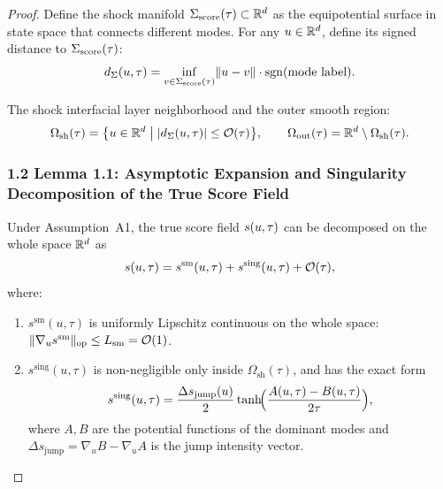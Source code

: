 \begin{proof}
Define the shock manifold $\Sigma_{\mathrm{score}}(\tau) \subset \mathbb{R}^d$ as the equipotential surface in state space that connects different modes. For any $u \in \mathbb{R}^d$, define its signed distance to $\Sigma_{\mathrm{score}}(\tau)$:
\begin{equation}
  d_{\Sigma}(u, \tau) = \inf_{v \in \Sigma_{\mathrm{score}}(\tau)} \lVert u - v \rVert \cdot \mathrm{sgn}(\text{mode label}).
\end{equation}

The shock interfacial layer neighborhood and the outer smooth region:
\begin{equation}
  \Omega_{\mathrm{sh}}(\tau) = \bigl\{ u \in \mathbb{R}^d \;\big|\; |d_{\Sigma}(u, \tau)| \leq \mathcal{O}(\tau) \bigr\}, \qquad
  \Omega_{\mathrm{out}}(\tau) = \mathbb{R}^d \setminus \Omega_{\mathrm{sh}}(\tau).
\end{equation}

\subsubsection{1.2 Lemma 1.1: Asymptotic Expansion and Singularity Decomposition of the True Score Field}

\begin{lemma}\label{lem:1.1}
Under Assumption~A1, the true score field $s(u, \tau)$ can be decomposed on the whole space $\mathbb{R}^d$ as
\begin{equation}
  s(u, \tau) = s^{\mathrm{sm}}(u, \tau) + s^{\mathrm{sing}}(u, \tau) + \mathcal{O}(\tau),
\end{equation}
where:
\begin{enumerate}
  \item $s^{\mathrm{sm}}(u, \tau)$ is uniformly Lipschitz continuous on the whole space: $\lVert \nabla_u s^{\mathrm{sm}} \rVert_{\mathrm{op}} \leq L_{\mathrm{sm}} = \mathcal{O}(1)$.
  \item $s^{\mathrm{sing}}(u, \tau)$ is non-negligible only inside $\Omega_{\mathrm{sh}}(\tau)$, and has the exact form
  \begin{equation}
    s^{\mathrm{sing}}(u, \tau) = \frac{\Delta s_{\mathrm{jump}}(u)}{2} \tanh\!\Bigl(\frac{A(u,\tau) - B(u,\tau)}{2\tau}\Bigr),
  \end{equation}
  where $A, B$ are the potential functions of the dominant modes and $\Delta s_{\mathrm{jump}} = \nabla_u B - \nabla_u A$ is the jump intensity vector.
\end{enumerate}
\end{lemma}


\end{proof}
